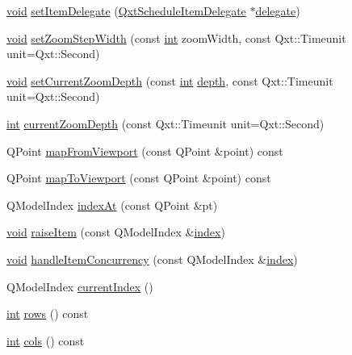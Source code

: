 \begin{DoxyCompactItemize}
\item 
\hyperlink{group___u_a_v_objects_plugin_ga444cf2ff3f0ecbe028adce838d373f5c}{void} \hyperlink{class_qxt_schedule_view_aee911d2ee254194c669a625e99939632}{set\-Item\-Delegate} (\hyperlink{qxtscheduleitemdelegate_8h_a9b8b6fec2a65bed5bb2b496d7178c6e0}{Qxt\-Schedule\-Item\-Delegate} $\ast$\hyperlink{class_qxt_schedule_view_a5ebc3f4a9bb0bf5ed11ee02f26775bb8}{delegate})
\item 
\hyperlink{group___u_a_v_objects_plugin_ga444cf2ff3f0ecbe028adce838d373f5c}{void} \hyperlink{class_qxt_schedule_view_a99c699af13e800f79e5192540abe2998}{set\-Zoom\-Step\-Width} (const \hyperlink{ioapi_8h_a787fa3cf048117ba7123753c1e74fcd6}{int} zoom\-Width, const Qxt\-::\-Timeunit unit=Qxt\-::\-Second)
\item 
\hyperlink{group___u_a_v_objects_plugin_ga444cf2ff3f0ecbe028adce838d373f5c}{void} \hyperlink{class_qxt_schedule_view_a3755f30f9b62f8d0f7ee095c5df06583}{set\-Current\-Zoom\-Depth} (const \hyperlink{ioapi_8h_a787fa3cf048117ba7123753c1e74fcd6}{int} \hyperlink{glext_8h_ab9dbe6fd459e0977873d5bfe29cec173}{depth}, const Qxt\-::\-Timeunit unit=Qxt\-::\-Second)
\item 
\hyperlink{ioapi_8h_a787fa3cf048117ba7123753c1e74fcd6}{int} \hyperlink{class_qxt_schedule_view_acf31c73809fafd8521bd1e6da295af05}{current\-Zoom\-Depth} (const Qxt\-::\-Timeunit unit=Qxt\-::\-Second)
\item 
Q\-Point \hyperlink{class_qxt_schedule_view_ac787ddfc383891647e89a969c1434e3c}{map\-From\-Viewport} (const Q\-Point \&point) const 
\item 
Q\-Point \hyperlink{class_qxt_schedule_view_a05d6a1b34ec33aee70379fa34d7fdb92}{map\-To\-Viewport} (const Q\-Point \&point) const 
\item 
Q\-Model\-Index \hyperlink{class_qxt_schedule_view_acdfcea81f0e47180b0ab4d9191c54aeb}{index\-At} (const Q\-Point \&pt)
\item 
\hyperlink{group___u_a_v_objects_plugin_ga444cf2ff3f0ecbe028adce838d373f5c}{void} \hyperlink{class_qxt_schedule_view_af5f93456a6d8d9c92593226e35f8b62c}{raise\-Item} (const Q\-Model\-Index \&\hyperlink{glext_8h_ab47dd9958bcadea08866b42bf358e95e}{index})
\item 
\hyperlink{group___u_a_v_objects_plugin_ga444cf2ff3f0ecbe028adce838d373f5c}{void} \hyperlink{class_qxt_schedule_view_a0ca51be10191c3afa761dd2f5925fb81}{handle\-Item\-Concurrency} (const Q\-Model\-Index \&\hyperlink{glext_8h_ab47dd9958bcadea08866b42bf358e95e}{index})
\item 
Q\-Model\-Index \hyperlink{class_qxt_schedule_view_a279f87dc5b35decdbe5c533365e73fa0}{current\-Index} ()
\item 
\hyperlink{ioapi_8h_a787fa3cf048117ba7123753c1e74fcd6}{int} \hyperlink{class_qxt_schedule_view_a969bba536414f77f1dec58ac5138ef6c}{rows} () const 
\item 
\hyperlink{ioapi_8h_a787fa3cf048117ba7123753c1e74fcd6}{int} \hyperlink{class_qxt_schedule_view_a52a9face314b459610810987740bbd44}{cols} () const 
\end{DoxyCompactItemize}
